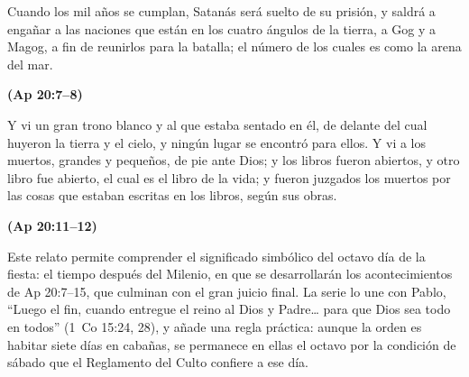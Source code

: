 \documentclass[11pt,letterpaper]{article}
\newcommand{\fuente}[1]{\par\hfill{\upshape\bfseries\small\textcolor{tierraroja}{#1}}}
\begin{document}
\begin{cita}Cuando los mil años se cumplan, Satanás será suelto de su prisión, y saldrá a engañar a las naciones que están en los cuatro ángulos de la tierra, a Gog y a Magog, a fin de reunirlos para la batalla; el número de los cuales es como la arena del mar.\fuente{(Ap 20:7--8)}\end{cita}

\begin{cita}Y vi un gran trono blanco y al que estaba sentado en él, de delante del cual huyeron la tierra y el cielo, y ningún lugar se encontró para ellos. Y vi a los muertos, grandes y pequeños, de pie ante Dios; y los libros fueron abiertos, y otro libro fue abierto, el cual es el libro de la vida; y fueron juzgados los muertos por las cosas que estaban escritas en los libros, según sus obras.\fuente{(Ap 20:11--12)}\end{cita}

Este relato permite comprender el significado simbólico del octavo día de la fiesta: el tiempo después del Milenio, en que se desarrollarán los acontecimientos de Ap 20:7--15, que culminan con el gran juicio final. La serie lo une con Pablo, ``Luego el fin, cuando entregue el reino al Dios y Padre\ldots{} para que Dios sea todo en todos'' (1~Co 15:24, 28), y añade una regla práctica: aunque la orden es habitar siete días en cabañas, se permanece en ellas el octavo por la condición de sábado que el Reglamento del Culto confiere a ese día.
\end{document}
